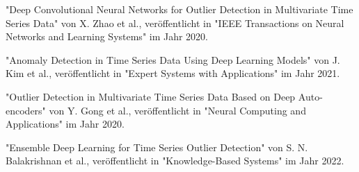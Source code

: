     "Deep Convolutional Neural Networks for Outlier Detection in Multivariate Time Series Data" von X. Zhao et al., veröffentlicht in "IEEE Transactions on Neural Networks and Learning Systems" im Jahr 2020.

    "Anomaly Detection in Time Series Data Using Deep Learning Models" von J. Kim et al., veröffentlicht in "Expert Systems with Applications" im Jahr 2021.

    "Outlier Detection in Multivariate Time Series Data Based on Deep Auto-encoders" von Y. Gong et al., veröffentlicht in "Neural Computing and Applications" im Jahr 2020.

    "Ensemble Deep Learning for Time Series Outlier Detection" von S. N. Balakrishnan et al., veröffentlicht in "Knowledge-Based Systems" im Jahr 2022.